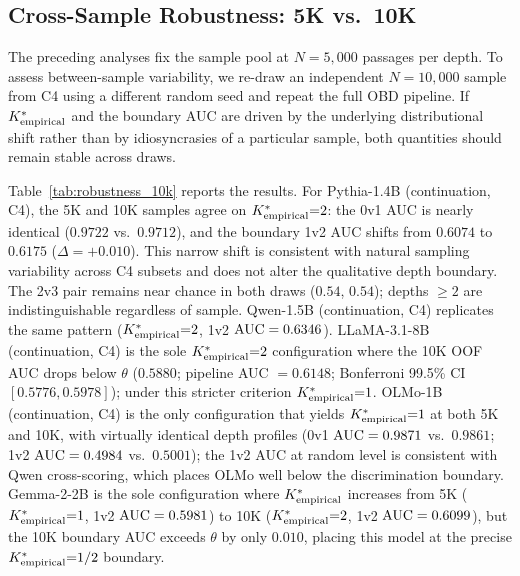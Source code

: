 \subsection{Cross-Sample Robustness: 5K vs.\ 10K}
\label{sec:robustness_10k}

The preceding analyses fix the sample pool at $N{=}5{,}000$ passages per depth.
To assess between-sample variability, we re-draw an independent $N{=}10{,}000$ sample from C4 using a different random seed and repeat the full OBD pipeline.
If ${K^*_{\text{empirical}}}$ and the boundary AUC are driven by the underlying distributional shift rather than by idiosyncrasies of a particular sample, both quantities should remain stable across draws.

Table~\ref{tab:robustness_10k} reports the results.
For Pythia-1.4B (continuation, C4), the 5K and 10K samples agree on ${K^*_{\text{empirical}}}{=}2$: the 0v1 AUC is nearly identical ($0.9722$ vs.\ $0.9712$), and the boundary 1v2 AUC shifts from $0.6074$ to $0.6175$ ($\Delta = +0.010$).
This narrow shift is consistent with natural sampling variability across C4 subsets and does not alter the qualitative depth boundary.
The 2v3 pair remains near chance in both draws ($0.54$, $0.54$); depths $\geq 2$ are indistinguishable regardless of sample.
Qwen-1.5B (continuation, C4) replicates the same pattern (${K^*_{\text{empirical}}}{=}2$, 1v2 $\text{AUC} = 0.6346$).
LLaMA-3.1-8B (continuation, C4) is the sole ${K^*_{\text{empirical}}}{=}2$ configuration where the 10K OOF AUC drops below $\theta$ ($0.5880$; pipeline AUC $= 0.6148$; Bonferroni 99.5\% CI $[0.5776, 0.5978]$); under this stricter criterion ${K^*_{\text{empirical}}}{=}1$.
OLMo-1B (continuation, C4) is the only configuration that yields ${K^*_{\text{empirical}}}{=}1$ at both 5K and 10K, with virtually identical depth profiles (0v1 $\text{AUC} = 0.9871$ vs.\ $0.9861$; 1v2 $\text{AUC} = 0.4984$ vs.\ $0.5001$); the 1v2 AUC at random level is consistent with Qwen cross-scoring, which places OLMo well below the discrimination boundary.
Gemma-2-2B is the sole configuration where ${K^*_{\text{empirical}}}$ increases from 5K (${K^*_{\text{empirical}}}{=}1$, 1v2 $\text{AUC} = 0.5981$) to 10K (${K^*_{\text{empirical}}}{=}2$, 1v2 $\text{AUC} = 0.6099$), but the 10K boundary AUC exceeds $\theta$ by only $0.010$, placing this model at the precise ${K^*_{\text{empirical}}}{=}1/2$ boundary.


